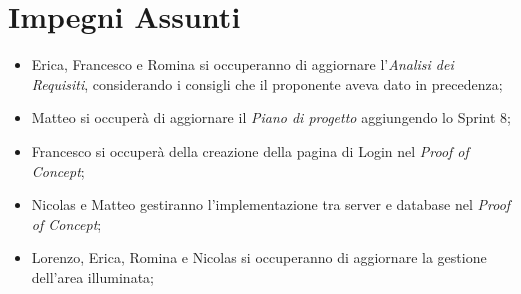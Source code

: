 \documentclass[a4paper, 12pt]{article}
\begin{document}
\section*{Impegni Assunti}
\begin{itemize}
    \item Erica, Francesco e Romina si occuperanno di aggiornare l'\textit{Analisi dei Requisiti}, considerando i consigli che il proponente aveva dato in precedenza;
    \item Matteo si occuperà di aggiornare il \textit{Piano di progetto} aggiungendo lo Sprint 8;
    \item Francesco si occuperà della creazione della pagina di Login nel \textit{Proof of Concept};
    \item Nicolas e Matteo gestiranno l'implementazione tra server e database nel \textit{Proof of Concept};
    \item Lorenzo, Erica, Romina e Nicolas si occuperanno di aggiornare la gestione dell'area illuminata;
\end{itemize}
\end{document}
